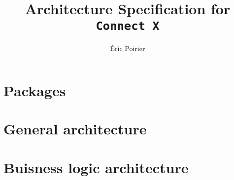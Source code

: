\documentclass{report}
\newcommand{\files}{./files/}
\begin{document}
\title{Architecture Specification for \texttt{Connect X}}
\author{Éric Poirier}
\maketitle


\chapter{Packages}


\chapter{General architecture}


\chapter{Buisness logic architecture}

\end{document}
